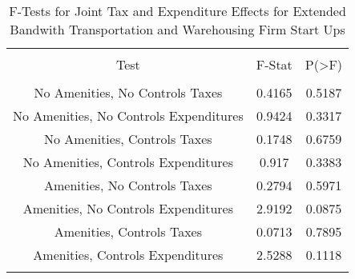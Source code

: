 
\begin{table}[!htbp] \centering 
  \caption{F-Tests for Joint Tax and Expenditure Effects for Extended Bandwith Transportation and Warehousing Firm Start Ups} 
  \label{48-49Ftests} 
\begin{tabular}{@{\extracolsep{5pt}} ccc} 
\\[-1.8ex]\hline 
\hline \\[-1.8ex] 
Test & F-Stat & P(\textgreater F) \\ 
\hline \\[-1.8ex] 
No Amenities, No Controls Taxes & 0.4165 & 0.5187 \\ 
No Amenities, No Controls Expenditures & 0.9424 & 0.3317 \\ 
No Amenities, Controls Taxes & 0.1748 & 0.6759 \\ 
No Amenities, Controls Expenditures & 0.917 & 0.3383 \\ 
Amenities, No Controls Taxes & 0.2794 & 0.5971 \\ 
Amenities, No Controls Expenditures & 2.9192 & 0.0875 \\ 
Amenities, Controls Taxes & 0.0713 & 0.7895 \\ 
Amenities, Controls Expenditures & 2.5288 & 0.1118 \\ 
\hline \\[-1.8ex] 
\end{tabular} 
\end{table} 
